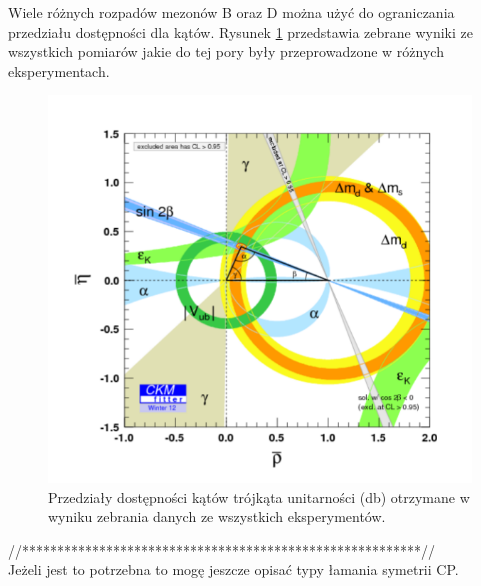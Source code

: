 Wiele różnych rozpadów mezonów B oraz D można użyć do ograniczania przedziału dostępności dla kątów. Rysunek \ref{fig:trojkat wyniki} przedstawia zebrane wyniki ze wszystkich pomiarów jakie do tej pory były przeprowadzone w   różnych eksperymentach. 
 


 \begin{figure}[ht]
 \centering
 \includegraphics[scale=0.7]{rozdzial1/triangle.png}
 \caption{Przedziały dostępności kątów trójkąta unitarności (db) otrzymane w wyniku zebrania danych ze wszystkich eksperymentów.}
 \label{fig:trojkat wyniki}
\end{figure}


//*********************************************************// \\
Jeżeli jest to potrzebna to mogę jeszcze opisać typy łamania symetrii CP.